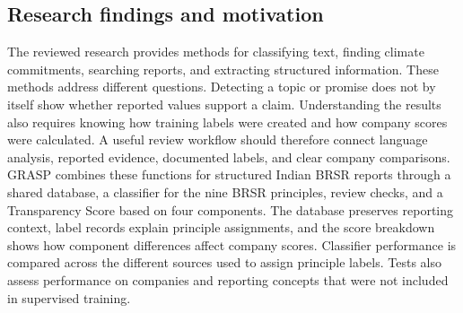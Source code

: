 \subsection{Research findings and motivation}

The reviewed research provides methods for classifying text, finding climate commitments, searching reports, and extracting structured information. These methods address different questions. Detecting a topic or promise does not by itself show whether reported values support a claim. Understanding the results also requires knowing how training labels were created and how company scores were calculated. A useful review workflow should therefore connect language analysis, reported evidence, documented labels, and clear company comparisons. GRASP combines these functions for structured Indian BRSR reports through a shared database, a classifier for the nine BRSR principles, review checks, and a Transparency Score based on four components. The database preserves reporting context, label records explain principle assignments, and the score breakdown shows how component differences affect company scores. Classifier performance is compared across the different sources used to assign principle labels. Tests also assess performance on companies and reporting concepts that were not included in supervised training.
